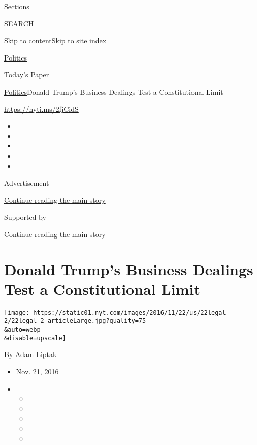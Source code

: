 Sections

SEARCH

\protect\hyperlink{site-content}{Skip to
content}\protect\hyperlink{site-index}{Skip to site index}

\href{https://www.nytimes.com/section/politics}{Politics}

\href{https://myaccount.nytimes.com/auth/login?response_type=cookie\&client_id=vi}{}

\href{https://www.nytimes.com/section/todayspaper}{Today's Paper}

\href{/section/politics}{Politics}\textbar{}Donald Trump's Business
Dealings Test a Constitutional Limit

\url{https://nyti.ms/2fjCidS}

\begin{itemize}
\item
\item
\item
\item
\item
\end{itemize}

Advertisement

\protect\hyperlink{after-top}{Continue reading the main story}

Supported by

\protect\hyperlink{after-sponsor}{Continue reading the main story}

\hypertarget{donald-trumps-business-dealings-test-a-constitutional-limit}{%
\section{Donald Trump's Business Dealings Test a Constitutional
Limit}\label{donald-trumps-business-dealings-test-a-constitutional-limit}}

\texttt{[image: https://static01.nyt.com/images/2016/11/22/us/22legal-2/22legal-2-articleLarge.jpg?quality=75\\\&auto=webp\\\&disable=upscale]}

By \href{http://www.nytimes.com/by/adam-liptak}{Adam Liptak}

\begin{itemize}
\item
  Nov. 21, 2016
\item
  \begin{itemize}
  \item
  \item
  \item
  \item
  \item
  \end{itemize}
\end{itemize}


